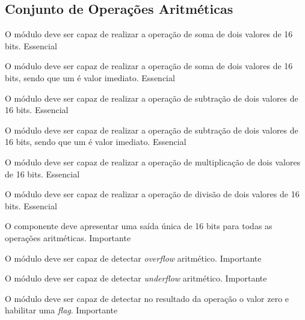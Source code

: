   \subsection{Conjunto de Operações Aritméticas} 
  
    \begin{functional}
      {O módulo deve ser capaz de realizar a operação de soma de dois valores de 16 bits.}
      {Essencial}
      
      {O módulo deve ser capaz de realizar a operação de soma de dois valores de 16 bits, sendo que um é valor imediato.}
      {Essencial}

      {O módulo deve ser capaz de realizar a operação de subtração de dois valores de 16 bits.}
      {Essencial}
      
      {O módulo deve ser capaz de realizar a operação de subtração de dois valores de 16 bits, sendo que um é valor imediato.}
      {Essencial}

      {O módulo deve ser capaz de realizar a operação de multiplicação de dois valores de 16 bits. }
      {Essencial}

      {O módulo deve ser capaz de realizar a operação de divisão de dois valores de 16 bits.}
      {Essencial} 
     

      {O componente deve apresentar uma saída única de 16 bits para todas as operações aritméticas.}
      {Importante}       

      {O módulo deve ser capaz de detectar \textit{overflow} aritmético.}
      {Importante}
      
      {O módulo deve ser capaz de detectar \textit{underflow} aritmético.}
      {Importante}
      
      {O módulo deve ser capaz de detectar no resultado da operação o valor zero e habilitar uma \textit{flag}.}
      {Importante}
      
    \end{functional}